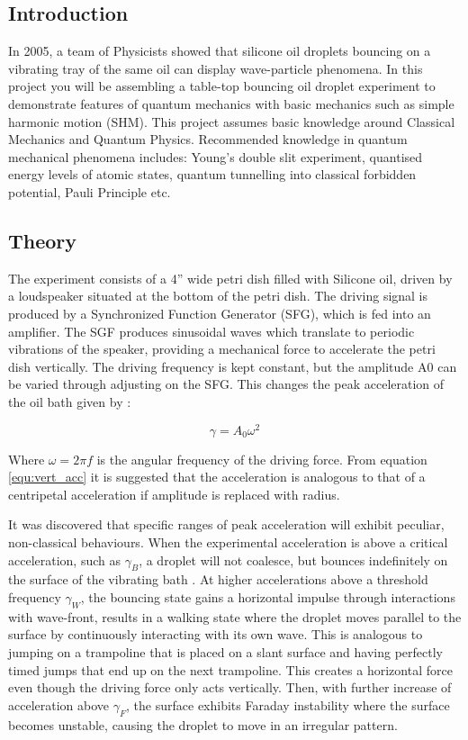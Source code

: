 \subsection{Introduction}

In 2005, a team of Physicists showed that silicone oil droplets bouncing on a vibrating tray of the same oil can display wave-particle phenomena. In this project you will be assembling a table-top bouncing oil droplet experiment to demonstrate features of quantum mechanics with basic mechanics such as simple harmonic motion (SHM). This project assumes basic knowledge around Classical Mechanics and Quantum Physics. Recommended knowledge in quantum mechanical phenomena includes: Young’s double slit experiment, quantised energy levels of atomic states, quantum tunnelling into classical forbidden potential, Pauli Principle etc.


\subsection{Theory}

The experiment consists of a 4” wide petri dish filled with Silicone oil, driven by a loudspeaker situated at the bottom of the petri dish. The driving signal is produced by a Synchronized Function Generator (SFG), which is fed into an amplifier. The SGF produces sinusoidal waves which translate to periodic vibrations of the speaker, providing a mechanical force to accelerate the petri dish vertically. The driving frequency is kept constant, but the amplitude A0 can be varied through adjusting on the SFG. This changes the peak acceleration of the oil bath given by \cite{harris2017visualization}:

\begin{equation}
\gamma =A_0{\omega }^2
\label{equ:vert_acc}
\end{equation}

Where $\omega =2\pi f$ is the angular frequency of the driving force. From equation \ref{equ:vert_acc} it is suggested that the acceleration is analogous to that of a centripetal acceleration if amplitude is replaced with radius.

It was discovered that specific ranges of peak acceleration will exhibit peculiar, non-classical behaviours. When the experimental acceleration is above a critical acceleration, such as ${\gamma }_B$, a droplet will not coalesce, but bounces indefinitely on the surface of the vibrating bath \cite{brady2014bouncing}. At  higher accelerations above a threshold frequency ${\gamma }_W$, the bouncing state gains a horizontal impulse through interactions with wave-front, results in a walking state where the droplet moves parallel to the surface by continuously interacting with its own wave. This is analogous to jumping on a trampoline that is placed on a slant surface and having perfectly timed jumps that end up on the next trampoline. This creates a horizontal force even though the driving force only acts vertically. Then, with further increase of acceleration above ${\gamma }_F$, the surface exhibits Faraday instability where the surface becomes unstable, causing the droplet to move in an irregular pattern.

